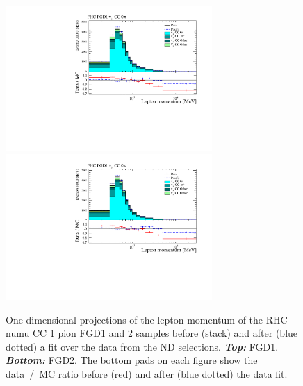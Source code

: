\begin{figure}[ht]
  \center
  \includegraphics[keepaspectratio=true,width=0.7\textwidth,page=14]{images/BANFF/reactionCodeStacks_PrefitAndPostfit_mom.pdf}\\
  \includegraphics[keepaspectratio=true,width=0.7\textwidth,page=17]{images/BANFF/reactionCodeStacks_PrefitAndPostfit_mom.pdf}\\
  \begin{center}
    \caption[RHC $\nu_\mu$ CC 1 pion FGD1 and 2 samples before and
    after a fit over the data from the ND280
    selections]{One-dimensional projections of the lepton momentum of
      the \Gls{RHC} \Gls{numu} \Gls{CC} 1 pion \Gls{FGD}1 and 2
      samples before (stack) and after (blue dotted) a fit over the
      data from the \Gls{ND} selections. \textbf{\textit{Top:}}
      \Gls{FGD}1. \textbf{\textit{Bottom:}} \Gls{FGD}2. The bottom
      pads on each figure show the data~/~\Gls{MC} ratio before (red)
      and after (blue dotted) the data fit.}
    \label{fig:numubkgCC1Pi}
  \end{center}
\end{figure}

